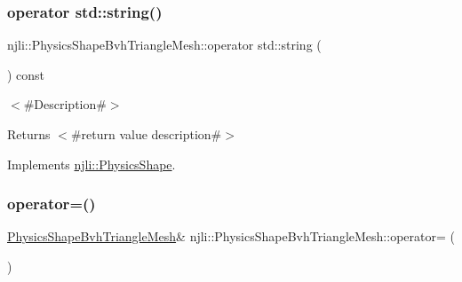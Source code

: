 \subsubsection{\texorpdfstring{operator std\+::string()}{operator std::string()}}
{\footnotesize\ttfamily njli\+::\+Physics\+Shape\+Bvh\+Triangle\+Mesh\+::operator std\+::string (\begin{DoxyParamCaption}{ }\end{DoxyParamCaption}) const\hspace{0.3cm}{\ttfamily [virtual]}}

$<$\#\+Description\#$>$

\begin{DoxyReturn}{Returns}
$<$\#return value description\#$>$ 
\end{DoxyReturn}


Implements \mbox{\hyperlink{classnjli_1_1_physics_shape_a890d915f88af06dcf1ac1fa4f5943dc2}{njli\+::\+Physics\+Shape}}.

\mbox{\label{classnjli_1_1_physics_shape_bvh_triangle_mesh_a13628bf9856c76e8f4cb10d867b80268}} 
\subsubsection{\texorpdfstring{operator=()}{operator=()}}
{\footnotesize\ttfamily \mbox{\hyperlink{classnjli_1_1_physics_shape_bvh_triangle_mesh}{Physics\+Shape\+Bvh\+Triangle\+Mesh}}\& njli\+::\+Physics\+Shape\+Bvh\+Triangle\+Mesh\+::operator= (\begin{DoxyParamCaption}\item[{const \mbox{\hyperlink{classnjli_1_1_physics_shape_bvh_triangle_mesh}{Physics\+Shape\+Bvh\+Triangle\+Mesh}} \&}]{ }\end{DoxyParamCaption})\hspace{0.3cm}{\ttfamily [protected]}}

\mbox{\label{classnjli_1_1_physics_shape_bvh_triangle_mesh_a559d30e350c441eeeceac724a635c9ad}} 

